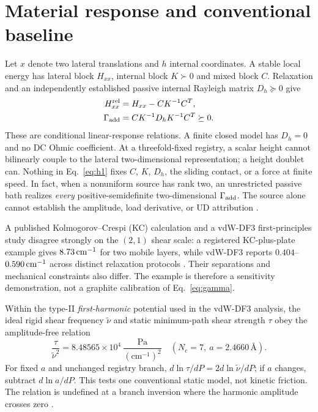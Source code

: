 \documentclass[9pt,a4paper,twocolumn]{extarticle}
\begin{document}
\section{Material response and conventional baseline}
Let $x$ denote two lateral translations and $h$ internal coordinates. A stable local energy has lateral block $H_{xx}$, internal block $K\succ0$ and mixed block $C$. Relaxation and an independently established passive internal Rayleigh matrix $D_h\succeq0$ give
\begin{align}
 H_{xx}^{\rm rel}&=H_{xx}-CK^{-1}C^T,\label{eq:schur}\\
 \Gamma_{\rm add}&=CK^{-1}D_hK^{-1}C^T\succeq0.\label{eq:gamma}
\end{align}
These are conditional linear-response relations. A finite closed model has $D_h=0$ and no DC Ohmic coefficient. At a threefold-fixed registry, a scalar height cannot bilinearly couple to the lateral two-dimensional representation; a height doublet can. Nothing in Eq.~\eqref{eq:h1} fixes $C$, $K$, $D_h$, the sliding contact, or a force at finite speed. In fact, when a nonuniform source has rank two, an unrestricted passive bath realizes \emph{every} positive-semidefinite two-dimensional $\Gamma_{\rm add}$. The source alone cannot establish the amplitude, load derivative, or UD attribution \cite{udphysics}.

A published Kolmogorov--Crespi (KC) calculation and a vdW-DF3 first-principles study disagree strongly on the $(2,1)$ shear scale: a registered KC-plus-plate example gives $8.73\,{\rm cm}^{-1}$ for two mobile layers, while vdW-DF3 reports $0.404$--$0.590\,{\rm cm}^{-1}$ across distinct relaxation protocols \cite{minkin,lebedeva,udrecord}. Their separations and mechanical constraints also differ. The example is therefore a sensitivity demonstration, not a graphite calibration of Eq.~\eqref{eq:gamma}.

Within the type-II \emph{first-harmonic} potential used in the vdW-DF3 analysis, the ideal rigid shear frequency $\widetilde\nu$ and static minimum-path shear strength $\tau$ obey the amplitude-free relation
\begin{equation}
 \frac{\tau}{\widetilde\nu^2}=
 8.48565\times10^4\ \frac{\mathrm{Pa}}{(\mathrm{cm}^{-1})^2}
 \quad (N_c=7,\ a=2.4660\,\text{\AA}).\label{eq:static}
\end{equation}
For fixed $a$ and unchanged registry branch, $d\ln\tau/dP=2d\ln\widetilde\nu/dP$; if $a$ changes, subtract $d\ln a/dP$. This tests one conventional static model, not kinetic friction. The relation is undefined at a branch inversion where the harmonic amplitude crosses zero \cite{lebedeva,udrecord}.
\end{document}
